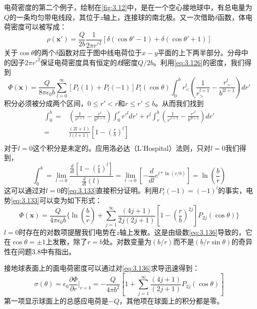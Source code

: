 \documentclass[12pt]{book}
\numberwithin{equation}{chapter}
\numberwithin{figure}{chapter}
\numberwithin{footnote}{page}
\begin{document}
电荷密度的第二个例子，绘制在\autoref{fig:3.12}中，是在一个空心接地球中，有总电量为$Q$的一条均匀带电线段，其位于$z$轴上，连接球的南北极。又一次借助$\delta$函数，体电荷密度可以被写成：
\begin{equation}\label{eq:3.132}
    \rho(\mathbf{x'})=\frac{Q}{2b}\frac{1}{2\pi r'^2}[\delta(\cos\theta'-1)+\delta(\cos\theta'+1)]
\end{equation}
关于$\cos\theta$的两个$\delta$函数对应于图中线电荷位于$x-y$平面的上下两半部分。分母中的因子$2\pi r'^2$保证电荷密度具有恒定的\textit{线}密度$Q/2b$。利用\autoref{eq:3.126}的密度，我们得到
\begin{equation}\label{eq:3.133}
    \Phi(\mathbf{x})=\frac{Q}{8\pi\epsilon_0 b}\sum_{l=0}^\infty [P_l(1)+P_l(-1)]P_l(\cos\theta)\int_0^b r_<^l(\frac{1}{r_>^{l+1}}-\frac{r_>^l}{b^{2l+1}})dr'
\end{equation}
积分必须被分成两个区间，$0\leq r'< r$和$r\leq r'\leq b$。从而我们找到
\begin{equation}\label{eq:3.134}
    \begin{aligned}
        \int_0^b=&(\frac{1}{r^{l+1}}-\frac{r^l}{b^{2l+1}})\int_0^r r'^l dr'+r^l \int_r^b (\frac{1}{r'^{l+1}}-\frac{r'^l}{b^{2l+1}})dr'\\
        =&\frac{(2l+1)}{l(l+1)}[1-(\frac{r}{b})^l]\\
    \end{aligned}
\end{equation}
对于$l=0$这个积分是未定的。应用洛必达（L'Hospital）法则，只对$l=0$我们得到，
\begin{equation}\label{eq:3.135}
    \int_0^b=\lim_{l\to0}\frac{\frac{d}{dl}[1-(\frac{r}{b})^l]}{\frac{d}{dl}(l)}=\lim_{l\to0}[-\frac{d}{dl}e^{l*\ln(r/b)}]=\ln(\frac{b}{r})
\end{equation}
这可以通过对$l=0$的\autoref{eq:3.133}直接积分证明。利用$P_l(-1)=(-1)^l$的事实，电势\autoref{eq:3.133}可以变为如下形式：
\begin{equation}\label{eq:3.136}
    \Phi(\mathbf{x})=\frac{Q}{4\pi\epsilon_0 b}\{\ln(\frac{b}{r})+\sum_{j=1}^\infty \frac{(4j+1)}{2j(2j+1)}[1-(\frac{r}{b})^{2j}]P_{2j}(\cos\theta)\}
\end{equation}
$l=0$时存在的对数项提醒我们电势在$z$轴上发散。这是由级数\autoref{eq:3.136}导致的，它在$\cos\theta=\pm1$上发散，除了$r=b$处。对数变量为$(b/r)$而不是$(b/r\sin\theta)$的奇异性在问题3.8中有指出。

接地球表面上的面电荷密度可以通过对\autoref{eq:3.136}求导迅速得到：
\begin{equation}\label{eq:3.137}
    \sigma(\theta)=\epsilon_0 \frac{\partial \Phi}{\partial r}|_{r=b}=-\frac{Q}{4\pi b^2}[1+\sum_{j=1}^\infty \frac{(4j+1)}{(2j+1)}P_{2j}(\cos\theta)]
\end{equation}
第一项显示球面上的总感应电荷是$-Q$，其他项在球面上的积分都是零。
\end{document}
